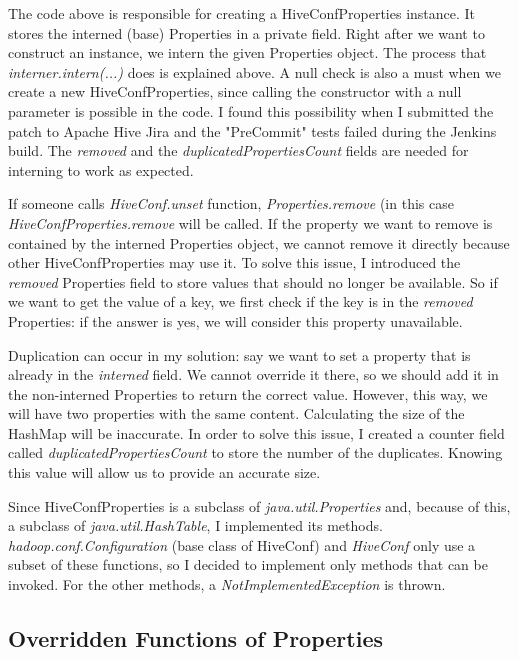 The code above is responsible for creating a HiveConfProperties instance. It stores the interned (base) Properties in a private field. Right after we want to construct an instance, we intern the given Properties object. The process that \textit{interner.intern(...)} does is explained above. A null check is also a must when we create a new HiveConfProperties, since calling the constructor with a null parameter is possible in the code. I found this possibility when I submitted the patch to Apache Hive Jira and the "PreCommit" tests failed during the Jenkins build. The \textit{removed} and the \textit{duplicatedPropertiesCount} fields are needed for interning to work as expected. 

If someone calls \textit{HiveConf.unset} function, \textit{Properties.remove} (in this case \textit{HiveConfProperties.remove} will be called. If the property we want to remove is contained by the interned Properties object, we cannot remove it directly because other HiveConfProperties may use it. To solve this issue, I introduced the \textit{removed} Properties field to store values that should no longer be available. So if we want to get the value of a key, we first check if the key is in the \textit{removed} Properties: if the answer is yes, we will consider this property unavailable.

Duplication can occur in my solution: say we want to set a property that is already in the \textit{interned} field. We cannot override it there, so we should add it in the non-interned Properties to return the correct value. However, this way, we will have two properties with the same content. Calculating the size of the HashMap will be inaccurate. In order to solve this issue, I created a counter field called \textit{duplicatedPropertiesCount} to store the number of the duplicates. Knowing this value will allow us to provide an accurate size. 


Since HiveConfProperties is a subclass of \textit{java.util.Properties} and, because of this, a subclass of \textit{java.util.HashTable}, I implemented its methods.  \textit{hadoop.conf.Configuration} (base class of HiveConf) and \textit{HiveConf} only use a subset of these functions, so I decided to implement only methods that can be invoked. For the other methods, a \textit{NotImplementedException} is thrown.  

\subsection{Overridden Functions of Properties}
